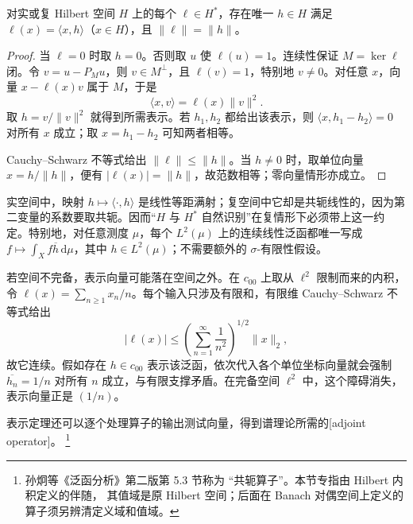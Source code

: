 \begin{theorem}\label{b1:thm:hilbert-riesz}
对实或复 Hilbert 空间 \(H\) 上的每个 \(\ell\in H^*\)，存在唯一 \(h\in H\) 满足 \(\ell(x)=\langle x,h\rangle\)（\(x\in H\)），且 \(\|\ell\|=\|h\|\)。
\end{theorem}
\begin{proof}
当 \(\ell=0\) 时取 \(h=0\)。否则取 \(u\) 使 \(\ell(u)=1\)。连续性保证 \(M=\ker\ell\) 闭。令 \(v=u-P_Mu\)，则 \(v\in M^\perp\)，且 \(\ell(v)=1\)，特别地 \(v\ne0\)。对任意 \(x\)，向量 \(x-\ell(x)v\) 属于 \(M\)，于是
\[
\langle x,v\rangle=\ell(x)\|v\|^2.
\]
取 \(h=v/\|v\|^2\) 就得到所需表示。若 \(h_1,h_2\) 都给出该表示，则 \(\langle x,h_1-h_2\rangle=0\) 对所有 \(x\) 成立；取 \(x=h_1-h_2\) 可知两者相等。

Cauchy--Schwarz 不等式给出 \(\|\ell\|\leq\|h\|\)。当 \(h\ne0\) 时，取单位向量 \(x=h/\|h\|\)，便有 \(|\ell(x)|=\|h\|\)，故范数相等；零向量情形亦成立。
\end{proof}

实空间中，映射 \(h\mapsto\langle\cdot,h\rangle\) 是线性等距满射；复空间中它却是共轭线性的，因为第二变量的系数要取共轭。因而“\(H\) 与 \(H^*\) 自然识别”在复情形下必须带上这一约定。特别地，对任意测度 \(\mu\)，每个 \(L^2(\mu)\) 上的连续线性泛函都唯一写成 \(f\mapsto\int_Xf\overline h\,\mathrm d\mu\)，其中 \(h\in L^2(\mu)\)；不需要额外的 \(\sigma\)-有限性假设。

\ProseParagraphBreak

若空间不完备，表示向量可能落在空间之外。在 \(c_{00}\) 上取从 \(\ell^2\) 限制而来的内积，令 \(\ell(x)=\sum_{n\geq1}x_n/n\)。每个输入只涉及有限和，有限维 Cauchy--Schwarz 不等式给出
\[
|\ell(x)|\leq\left(\sum_{n=1}^{\infty}\dfrac1{n^2}\right)^{1/2}\|x\|_2,
\]
故它连续。假如存在 \(h\in c_{00}\) 表示该泛函，依次代入各个单位坐标向量就会强制 \(\overline{h_n}=1/n\) 对所有 \(n\) 成立，与有限支撑矛盾。在完备空间 \(\ell^2\) 中，这个障碍消失，表示向量正是 \((1/n)\)。

\ProseParagraphBreak

表示定理还可以逐个处理算子的输出测试向量，得到谱理论所需的[adjoint operator]。%
\footnote{孙炯等《泛函分析》第二版\cite{Sun2018Fanhan}第 5.3 节称为
“共轭算子”。本节专指由 Hilbert 内积定义的伴随，
其值域是原 Hilbert 空间；后面在 Banach 对偶空间上定义的算子须另辨清定义域和值域。}


